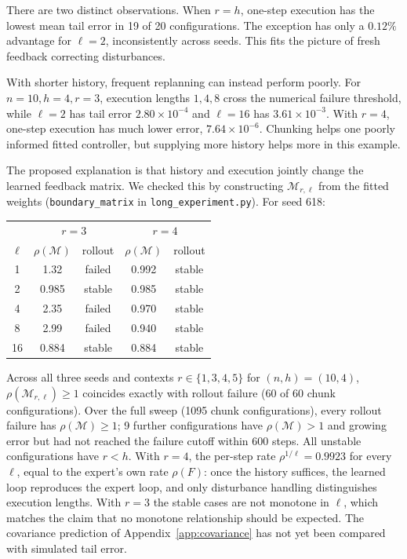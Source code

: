 \documentclass[12 pt]{article}        	%
\theoremstyle{definition}
\begin{document}
There are two distinct observations. When $r=h$, one-step execution has the lowest mean tail error in 19 of 20 configurations. The exception has only a $0.12\%$ advantage for $\ell=2$, inconsistently across seeds. This fits the picture of fresh feedback correcting disturbances.

With shorter history, frequent replanning can instead perform poorly. For $n=10,h=4,r=3$, execution lengths $1,4,8$ cross the numerical failure threshold, while $\ell=2$ has tail error $2.80\times10^{-4}$ and $\ell=16$ has $3.61\times10^{-3}$. With $r=4$, one-step execution has much lower error, $7.64\times10^{-6}$. Chunking helps one poorly informed fitted controller, but supplying more history helps more in this example.

The proposed explanation is that history and execution jointly change the learned feedback matrix. We checked this by constructing $\mathcal M_{r,\ell}$ from the fitted weights (\texttt{boundary\_matrix} in \texttt{long\_experiment.py}). For seed 618:
\begin{center}
\begin{tabular}{c|cc|cc}
&\multicolumn{2}{c|}{$r=3$}&\multicolumn{2}{c}{$r=4$}\\
$\ell$&$\rho(\mathcal M)$&rollout&$\rho(\mathcal M)$&rollout\\\hline
1&1.32&failed&0.992&stable\\
2&0.985&stable&0.985&stable\\
4&2.35&failed&0.970&stable\\
8&2.99&failed&0.940&stable\\
16&0.884&stable&0.884&stable
\end{tabular}
\end{center}
Across all three seeds and contexts $r\in\{1,3,4,5\}$ for $(n,h)=(10,4)$, $\rho(\mathcal M_{r,\ell})\ge1$ coincides exactly with rollout failure (60 of 60 chunk configurations). Over the full sweep (1095 chunk configurations), every rollout failure has $\rho(\mathcal M)\ge1$; 9 further configurations have $\rho(\mathcal M)>1$ and growing error but had not reached the failure cutoff within 600 steps. All unstable configurations have $r<h$. With $r=4$, the per-step rate $\rho^{1/\ell}=0.9923$ for every $\ell$, equal to the expert's own rate $\rho(F)$: once the history suffices, the learned loop reproduces the expert loop, and only disturbance handling distinguishes execution lengths. With $r=3$ the stable cases are not monotone in $\ell$, which matches the claim that no monotone relationship should be expected. The covariance prediction of Appendix~\ref{app:covariance} has not yet been compared with simulated tail error.
\end{document}
